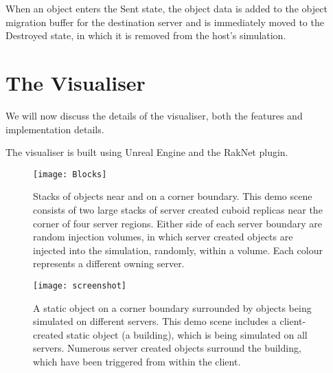 When an object enters the Sent state, the object data is added to the object migration buffer for the destination server and is immediately moved to the Destroyed state, in which it is removed from the host's simulation.

\section{The Visualiser}
We will now discuss the details of the visualiser, both the features and implementation details.

The visualiser is built using Unreal Engine and the RakNet plugin.

\begin{figure}[!t]
	\centering
	\texttt{[image: Blocks]}
	\caption{Stacks of objects near and on a corner boundary. This demo scene consists of two large stacks of server created cuboid replicas near the corner of four server regions. Either side of each server boundary are random injection volumes, in which server created objects are injected into the simulation, randomly, within a volume. Each colour represents a different owning server.}
	\label{fig_screen1}
\end{figure}

\begin{figure}[!t]
	\centering
	\texttt{[image: screenshot]}
	\caption{A static object on a corner boundary surrounded by objects being simulated on different servers. This demo scene includes a client-created static object (a building), which is being simulated on all servers. Numerous server created objects surround the building, which have been triggered from within the client.}
	\label{fig_screen2}
\end{figure}

